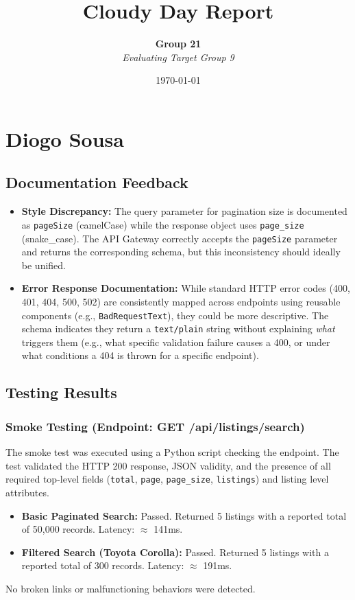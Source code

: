 \documentclass[11pt,a4paper]{article}
\title{\vspace{-2cm}\textbf{\Huge Cloudy Day Report}\vspace{0.5cm}}
\author{\textbf{Group 21} \\ \textit{Evaluating Target Group 9}}
\date{\today}
\begin{document}
\maketitle
\thispagestyle{empty}

\vspace{1cm}

\section*{Diogo Sousa}

\subsection*{Documentation Feedback}
\begin{itemize}
    \item \textbf{Style Discrepancy:} The query parameter for pagination size is documented as \texttt{pageSize} (camelCase) while the response object uses \texttt{page\_size} (snake\_case). The API Gateway correctly accepts the \texttt{pageSize} parameter and returns the corresponding schema, but this inconsistency should ideally be unified.
    \item \textbf{Error Response Documentation:} While standard HTTP error codes (400, 401, 404, 500, 502) are consistently mapped across endpoints using reusable components (e.g., \texttt{BadRequestText}), they could be more descriptive. The schema indicates they return a \texttt{text/plain} string without explaining \textit{what} triggers them (e.g., what specific validation failure causes a 400, or under what conditions a 404 is thrown for a specific endpoint).
\end{itemize}

\subsection*{Testing Results}

\subsubsection*{Smoke Testing (Endpoint: GET /api/listings/search)}
The smoke test was executed using a Python script checking the endpoint. The test validated the HTTP 200 response, JSON validity, and the presence of all required top-level fields (\texttt{total}, \texttt{page}, \texttt{page\_size}, \texttt{listings}) and listing level attributes.
\begin{itemize}
    \item \textbf{Basic Paginated Search:} Passed. Returned 5 listings with a reported total of 50,000 records. Latency: $\approx$ 141ms.
    \item \textbf{Filtered Search (Toyota Corolla):} Passed. Returned 5 listings with a reported total of 300 records. Latency: $\approx$ 191ms.
\end{itemize}
No broken links or malfunctioning behaviors were detected.
\end{document}
